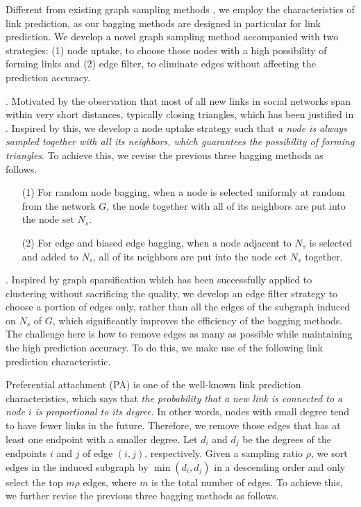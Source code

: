 Different from existing graph sampling methods \cite{ahmed2014tkdd, leskovec2006},
we employ the characteristics of link prediction, as our bagging methods are designed in particular for link prediction.
We develop a novel graph sampling method accompanied with two strategies:
(1) node uptake, to choose those nodes with a high possibility of forming links  and (2) edge filter, to eliminate edges without affecting the prediction accuracy.


. Motivated by the observation that most of all new links in social networks span within very short distances, typically closing triangles, which has been justified in \cite{leskovec-2008}.  Inspired by this, we develop a node uptake strategy such that {\em a node is always sampled together
with all its neighbors, which guarantees the possibility of forming triangles}. To achieve this, we revise the previous three bagging methods as follows.

\vspace{-1ex}
\begin{enumerate}
\item[(1)]
For random node bagging, when a node is selected uniformly at random from the network $G$, the node together with all of
its neighbors are put into the node set $N_s$.
\item[(2)]
For edge and biased edge bagging, when a node adjacent to $N_s$ is
 selected and added to $N_s$, all of its neighbors are put into the node set $N_s$ together.
\end{enumerate}
\vspace{-1ex}


. Inspired by graph sparsification \cite{chen2015, satuluri2011}
which has been successfully applied to clustering without sacrificing the quality,
we develop an edge filter strategy to choose a portion of edges only, rather than all the edges of the subgraph induced on $N_s$ of $G$,
which significantly improves the efficiency of the bagging methods.
The challenge here is how to remove edges as many as possible while maintaining the high prediction accuracy.
To do this, we make use of the following link prediction characteristic.


Preferential attachment (PA) \cite{albert1999,leskovec-2008} is one of the well-known
link prediction characteristics, which says that {\em the probability
that a new link is connected to a node $i$ is proportional to its degree}.
In other words, nodes with small degree tend to have fewer links in the future.
Therefore, we remove those edges that has at least one endpoint  with a smaller degree.
Let $d_i$ and $d_j$ be the degrees of the endpoints $i$  and $j$ of edge $(i, j)$, respectively. Given a sampling ratio $\rho$,
we sort edges in the induced subgraph by $\min(d_i, d_j)$ in a
descending order and only select the top $m\rho$ edges, where $m$ is the total number of edges.
%
To achieve this, we further revise the previous three bagging methods as follows.

